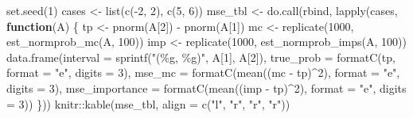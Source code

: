 \documentclass[
  letterpaper,
  DIV=11,
  numbers=noendperiod]{scrreprt}
\newenvironment{Shaded}{\begin{snugshade}}{\end{snugshade}}
\newcommand{\AttributeTok}[1]{\textcolor[rgb]{0.40,0.45,0.13}{#1}}
\newcommand{\ControlFlowTok}[1]{\textcolor[rgb]{0.00,0.23,0.31}{\textbf{#1}}}
\newcommand{\DecValTok}[1]{\textcolor[rgb]{0.68,0.00,0.00}{#1}}
\newcommand{\FunctionTok}[1]{\textcolor[rgb]{0.28,0.35,0.67}{#1}}
\newcommand{\NormalTok}[1]{\textcolor[rgb]{0.00,0.23,0.31}{#1}}
\newcommand{\OtherTok}[1]{\textcolor[rgb]{0.00,0.23,0.31}{#1}}
\newcommand{\SpecialCharTok}[1]{\textcolor[rgb]{0.37,0.37,0.37}{#1}}
\newcommand{\StringTok}[1]{\textcolor[rgb]{0.13,0.47,0.30}{#1}}
\begin{document}
\begin{Shaded}
\begin{Highlighting}[]
\FunctionTok{set.seed}\NormalTok{(}\DecValTok{1}\NormalTok{)}
\NormalTok{cases }\OtherTok{\textless{}{-}} \FunctionTok{list}\NormalTok{(}\FunctionTok{c}\NormalTok{(}\SpecialCharTok{{-}}\DecValTok{2}\NormalTok{, }\DecValTok{2}\NormalTok{), }\FunctionTok{c}\NormalTok{(}\DecValTok{5}\NormalTok{, }\DecValTok{6}\NormalTok{))}
\NormalTok{mse\_tbl }\OtherTok{\textless{}{-}} \FunctionTok{do.call}\NormalTok{(rbind, }\FunctionTok{lapply}\NormalTok{(cases, }\ControlFlowTok{function}\NormalTok{(A) \{}
\NormalTok{    tp }\OtherTok{\textless{}{-}} \FunctionTok{pnorm}\NormalTok{(A[}\DecValTok{2}\NormalTok{]) }\SpecialCharTok{{-}} \FunctionTok{pnorm}\NormalTok{(A[}\DecValTok{1}\NormalTok{])}
\NormalTok{    mc  }\OtherTok{\textless{}{-}} \FunctionTok{replicate}\NormalTok{(}\DecValTok{1000}\NormalTok{, }\FunctionTok{est\_normprob\_mc}\NormalTok{(A, }\DecValTok{100}\NormalTok{))}
\NormalTok{    imp }\OtherTok{\textless{}{-}} \FunctionTok{replicate}\NormalTok{(}\DecValTok{1000}\NormalTok{, }\FunctionTok{est\_normprob\_imps}\NormalTok{(A, }\DecValTok{100}\NormalTok{))}
    \FunctionTok{data.frame}\NormalTok{(}\AttributeTok{interval =} \FunctionTok{sprintf}\NormalTok{(}\StringTok{"(\%g, \%g)"}\NormalTok{, A[}\DecValTok{1}\NormalTok{], A[}\DecValTok{2}\NormalTok{]),}
               \AttributeTok{true\_prob =} \FunctionTok{formatC}\NormalTok{(tp, }\AttributeTok{format =} \StringTok{"e"}\NormalTok{, }\AttributeTok{digits =} \DecValTok{3}\NormalTok{),}
               \AttributeTok{mse\_mc =} \FunctionTok{formatC}\NormalTok{(}\FunctionTok{mean}\NormalTok{((mc }\SpecialCharTok{{-}}\NormalTok{ tp)}\SpecialCharTok{\^{}}\DecValTok{2}\NormalTok{), }\AttributeTok{format =} \StringTok{"e"}\NormalTok{, }\AttributeTok{digits =} \DecValTok{3}\NormalTok{),}
               \AttributeTok{mse\_importance =} \FunctionTok{formatC}\NormalTok{(}\FunctionTok{mean}\NormalTok{((imp }\SpecialCharTok{{-}}\NormalTok{ tp)}\SpecialCharTok{\^{}}\DecValTok{2}\NormalTok{), }\AttributeTok{format =} \StringTok{"e"}\NormalTok{, }\AttributeTok{digits =} \DecValTok{3}\NormalTok{))}
\NormalTok{\}))}
\NormalTok{knitr}\SpecialCharTok{::}\FunctionTok{kable}\NormalTok{(mse\_tbl, }\AttributeTok{align =} \FunctionTok{c}\NormalTok{(}\StringTok{"l"}\NormalTok{, }\StringTok{"r"}\NormalTok{, }\StringTok{"r"}\NormalTok{, }\StringTok{"r"}\NormalTok{))}
\end{Highlighting}
\end{Shaded}
\end{document}
